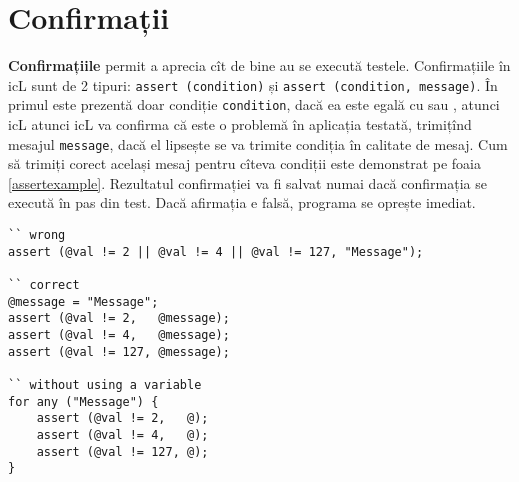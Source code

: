 \section{Confirmații}

{\bf Confirmațiile} permit a aprecia cît de bine au se execută testele. Confirmațiile în icL sunt de 2 tipuri: \texttt{assert (condition)} și \texttt{assert (condition, message)}. În primul este prezentă doar condiție \texttt{condition}, dacă ea este egală cu \false{} sau \void, atunci icL atunci icL va confirma că este o problemă în aplicația testată, trimițînd mesajul \texttt{message}, dacă el lipsește se va trimite condiția în calitate de mesaj. Cum să trimiți corect același mesaj pentru cîteva condiții este demonstrat pe foaia \ref{assertexample}. Rezultatul confirmației va fi salvat numai dacă confirmația se execută în pas din test. Dacă afirmația e falsă, programa se oprește imediat.

\begin{sourcecode}
\label{assertexample}
\begin{verbatim}
`` wrong
assert (@val != 2 || @val != 4 || @val != 127, "Message");

`` correct
@message = "Message";
assert (@val != 2,   @message);
assert (@val != 4,   @message);
assert (@val != 127, @message);

`` without using a variable
for any ("Message") {
	assert (@val != 2,   @);
	assert (@val != 4,   @);
	assert (@val != 127, @);
}
\end{verbatim}
\end{sourcecode}
